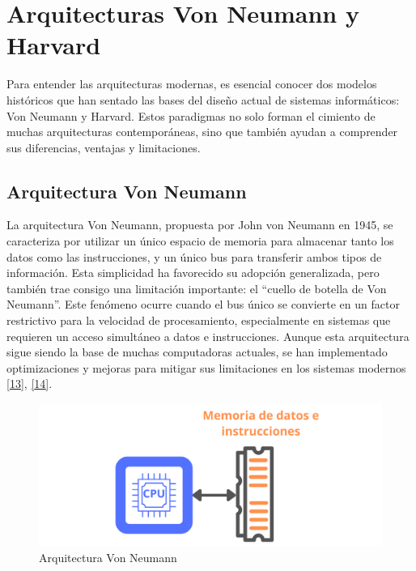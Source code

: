 \documentclass[12pt,oneside]{templates/unerthesis}
\begin{document}
\hypertarget{arquitecturas-von-neumann-y-harvard}{%
\section{Arquitecturas Von Neumann y Harvard}\label{arquitecturas-von-neumann-y-harvard}}

Para entender las arquitecturas modernas, es esencial conocer dos modelos históricos que han sentado las bases del diseño actual de sistemas informáticos: Von Neumann y Harvard. Estos paradigmas no solo forman el cimiento de muchas arquitecturas contemporáneas, sino que también ayudan a comprender sus diferencias, ventajas y limitaciones.

\hypertarget{arquitectura-von-neumann}{%
\subsection{Arquitectura Von Neumann}\label{arquitectura-von-neumann}}

La arquitectura Von Neumann, propuesta por John von Neumann en 1945, se caracteriza por utilizar un único espacio de memoria para almacenar tanto los datos como las instrucciones, y un único bus para transferir ambos tipos de información. Esta simplicidad ha favorecido su adopción generalizada, pero también trae consigo una limitación importante: el ``cuello de botella de Von Neumann''. Este fenómeno ocurre cuando el bus único se convierte en un factor restrictivo para la velocidad de procesamiento, especialmente en sistemas que requieren un acceso simultáneo a datos e instrucciones. Aunque esta arquitectura sigue siendo la base de muchas computadoras actuales, se han implementado optimizaciones y mejoras para mitigar sus limitaciones en los sistemas modernos \protect\hyperlink{ref-hennessy_computer_2012}{{[}13{]}}, \protect\hyperlink{ref-stallings_computer_2013}{{[}14{]}}.

\begin{figure}

{\centering \includegraphics[width=0.85\linewidth]{images/vonneumann} 

}

\caption{Arquitectura Von Neumann}\label{fig:vonneumann}
\end{figure}
\end{document}
